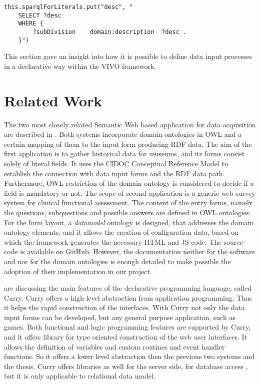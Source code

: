 \begin{lstlisting}[captionpos=b, caption= SPARQL forExisting variable definition, label=skullJSON, belowskip=1em, aboveskip=2em,
basicstyle=\footnotesize,frame=single]
	this.sparqlForLiterals.put("desc", "
	SELECT ?desc
	WHERE { 
		?subDivision	domain:description	?desc .
	}")
\end{lstlisting}

This section gave an insight into how it is possible to define data input processes in a declarative way within the VIVO framework.

\section{Related Work}

The two most closely related Semantic Web based application for data acquisition are described in \cite{embeddingOntology, DBLP:conf/icbo/GoncalvesTNTM15}. Both systems incorporate domain ontologies in OWL and a certain mapping of them to the input form producing RDF data. The aim of the first application is to gather historical data for museums, and its forms consist solely of literal fields. It uses the CIDOC Conceptual Reference Model \cite{CIDOC501} to establish the connection with data input forms and the RDF data path. Furthermore, OWL restriction of the domain ontology is considered to decide if a field is mandatory or not. The scope of second application is a generic web survey system for clinical functional assessment.  The content of the entry forms, namely the questions, subquestions and possible answers are defined in OWL ontologies. For the form layout, a \textit{datamodel} ontology is designed, that addresses the domain ontology elements, and it allows the creation of configuration data, based on which the framework generates the necessary HTML and JS code. The source-code is available on GitHub. However, the documentation neither for the software and nor for the domain ontologies is enough detailed to make possible the adoption of their implementation in our project.

\cite{Hanus06PPDP, Hanus2000} are discussing the main features of the declarative programming language, called Curry. Curry offers a high-level abstraction from application programming. Thus it helps the rapid construction of the interfaces. With Curry not only the data input forms can be developed, but any general purpose application, such as games. Both functional and logic programming features are supported by Curry, and it offers library for type oriented construction of the web user interfaces.  It allows the definition of variables and custom routines and event handler functions. So it offers a lower level abstraction then the previous two systems and the thesis. Curry offers libraries as well for the server side, for database access \cite{Brassel2008}, but it is only applicable to relational data model.

